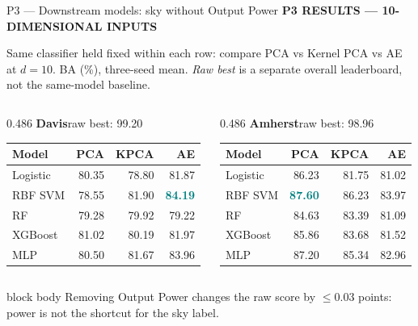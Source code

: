\documentclass[aspectratio=169,11pt]{beamer}
\newcommand{\sectiontag}[1]{{\footnotesize\usebeamercolor[fg]{structure}\textbf{#1}}\par\vspace{0.10cm}}
\newcommand{\smallmuted}[1]{{\footnotesize\color{slate}#1\par}}
\begin{document}
\begin{frame}{P3 — Downstream models: sky without Output Power}
\sectiontag{P3 \quad RESULTS — 10-DIMENSIONAL INPUTS}
\smallmuted{Same classifier held fixed within each row: compare PCA vs Kernel PCA vs AE at $d=10$. BA (\%), three-seed mean. \emph{Raw best} is a separate overall leaderboard, not the same-model baseline.}\vspace{0.18cm}
\begin{columns}[T,onlytextwidth]
\begin{column}{0.486\textwidth}
\textbf{Davis}\hfill{\scriptsize raw best: 99.20}\par\vspace{0.12cm}
{\fontsize{8.8}{10.4}\selectfont
\setlength{\tabcolsep}{3.9pt}
\renewcommand{\arraystretch}{1.39}
\begin{tabular}{@{}lrrr@{}}\toprule
\textbf{Model} & \textbf{PCA} & \textbf{KPCA} & \textbf{AE}\\\midrule
Logistic & 80.35 & 78.80 & 81.87\\
RBF SVM & 78.55 & 81.90 & \textcolor{teal}{\textbf{84.19}}\\
RF & 79.28 & 79.92 & 79.22\\
XGBoost & 81.02 & 80.19 & 81.97\\
MLP & 80.50 & 81.67 & 83.96\\
\bottomrule\end{tabular}}
\end{column}
\begin{column}{0.486\textwidth}
\textbf{Amherst}\hfill{\scriptsize raw best: 98.96}\par\vspace{0.12cm}
{\fontsize{8.8}{10.4}\selectfont
\setlength{\tabcolsep}{3.9pt}
\renewcommand{\arraystretch}{1.39}
\begin{tabular}{@{}lrrr@{}}\toprule
\textbf{Model} & \textbf{PCA} & \textbf{KPCA} & \textbf{AE}\\\midrule
Logistic & 86.23 & 81.75 & 81.02\\
RBF SVM & \textcolor{teal}{\textbf{87.60}} & 86.23 & 83.97\\
RF & 84.63 & 83.39 & 81.09\\
XGBoost & 85.86 & 83.68 & 81.52\\
MLP & 87.20 & 85.34 & 82.96\\
\bottomrule\end{tabular}}
\end{column}
\end{columns}
\vspace{0.30cm}
\begin{beamercolorbox}[wd=\linewidth,sep=0.14cm]{block body}
\footnotesize Removing Output Power changes the raw score by $\le$0.03 points: power is not the shortcut for the sky label.
\end{beamercolorbox}
\end{frame}
\end{document}
